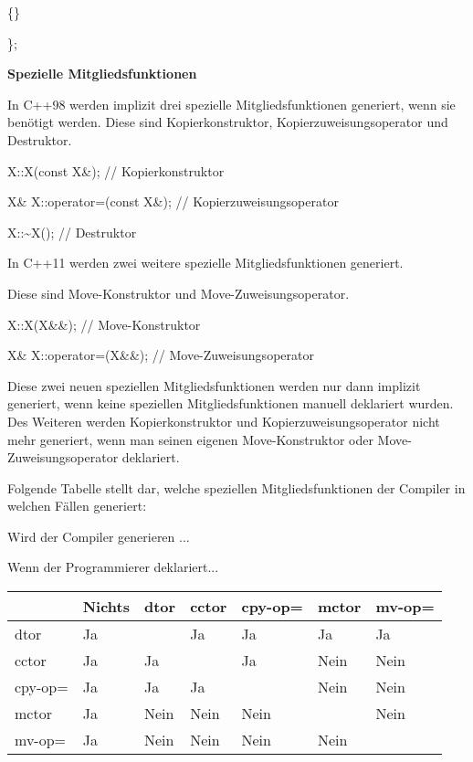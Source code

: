 \documentclass{article}
\begin{document}
\{\}

\};

\vspace{12pt}
\parindent=0pt
\textbf{Spezielle Mitgliedsfunktionen}

In C++98 werden implizit drei spezielle Mitgliedsfunktionen generiert, wenn sie 
benötigt werden. Diese sind Kopierkonstruktor, Kopierzuweisungsoperator und Destruktor.

X::X(const X\&);            // Kopierkonstruktor

X\& X::operator=(const X\&); // Kopierzuweisungsoperator

X::\textasciitilde{}X();                   // Destruktor

\vspace{12pt}
In C++11 werden zwei weitere spezielle Mitgliedsfunktionen generiert.

Diese sind Move-Konstruktor und Move-Zuweisungsoperator.

X::X(X\&\&);            // Move-Konstruktor

X\& X::operator=(X\&\&); // Move-Zuweisungsoperator

\vspace{12pt}
Diese zwei neuen speziellen Mitgliedsfunktionen werden nur dann implizit generiert, 
wenn keine speziellen Mitgliedsfunktionen manuell deklariert wurden. Des Weiteren 
werden Kopierkonstruktor und Kopierzuweisungsoperator nicht mehr generiert, wenn 
man seinen eigenen Move-Konstruktor oder Move-Zuweisungsoperator deklariert.

Folgende Tabelle stellt dar, welche speziellen Mitgliedsfunktionen der Compiler 
in welchen Fällen generiert:

Wird der Compiler generieren ...                        

\parindent=122pt
Wenn der Programmierer deklariert...

\parindent=0pt
\begin{tabular}{|>{\raggedright}p{8pt}|>{\raggedright}p{28pt}|>{\raggedright}p{28pt}|>{\raggedright}p{28pt}|>{\raggedright}p{28pt}|>{\raggedright}p{28pt}|>{\raggedright}p{28pt}|}
\hline
 & Nichts & dtor & cctor & cpy-op= & mctor & mv-op=\tabularnewline
\hline
dtor & Ja &  & Ja & Ja & Ja & Ja\tabularnewline
\hline
cctor & Ja & Ja &  & Ja & Nein & Nein\tabularnewline
\hline
cpy-op= & Ja & Ja & Ja &  & Nein & Nein\tabularnewline
\hline
mctor & Ja & Nein & Nein & Nein &  & Nein\tabularnewline
\hline
mv-op= & Ja & Nein & Nein & Nein & Nein & \tabularnewline
\hline
\end{tabular}
\end{document}
